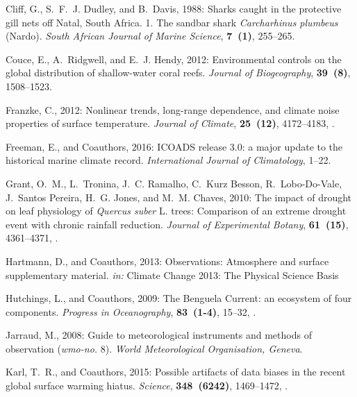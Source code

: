\documentclass[]{ametsoc}
\begin{document}
\begin{thebibliography}{41}
Cliff, G., S.~F.~J. Dudley, and B.~Davis, 1988: {Sharks caught in the
  protective gill nets off Natal, South Africa. 1. The sandbar shark
  \textit{Carcharhinus plumbeus} (Nardo)}. \textit{South African Journal of Marine
  Science}, \textbf{7~(1)}, 255--265.

Couce, E., A.~Ridgwell, and E.~J. Hendy, 2012: {Environmental controls on the
  global distribution of shallow-water coral reefs}. \textit{Journal of
  Biogeography}, \textbf{39~(8)}, 1508--1523.

Franzke, C., 2012: {Nonlinear trends, long-range dependence, and climate noise
  properties of surface temperature}. \textit{Journal of Climate},
  \textbf{25~(12)}, 4172--4183, .

Freeman, E., and Coauthors, 2016: {ICOADS release 3.0: a major update to the
  historical marine climate record}. \textit{International Journal of
  Climatology}, 1--22.

Grant, O.~M., L.~Tronina, J.~C. Ramalho, C.~{Kurz Besson}, R.~Lobo-Do-Vale,
  J.~{Santos Pereira}, H.~G. Jones, and M.~M. Chaves, 2010: {The impact of
  drought on leaf physiology of \textit{Quercus suber} L. trees: Comparison of an
  extreme drought event with chronic rainfall reduction}. \textit{Journal of
  Experimental Botany}, \textbf{61~(15)}, 4361--4371, .

Hartmann, D., and Coauthors, 2013: Observations: Atmosphere and surface 
  supplementary material. \textit{in:} Climate Change 2013: The Physical Science Basis

Hutchings, L., and Coauthors, 2009: {The Benguela Current: an ecosystem of four
  components}. \textit{Progress in Oceanography}, \textbf{83~(1-4)}, 15--32,
  .

Jarraud, M., 2008: Guide to meteorological instruments and methods of
  observation (\textit{wmo-no.} 8). \textit{World Meteorological Organisation, Geneva}.

Karl, T.~R., and Coauthors, 2015: {Possible artifacts of data biases in the
  recent global surface warming hiatus}. \textit{Science}, \textbf{348~(6242)},
  1469--1472, .


\end{thebibliography}
\end{document}

